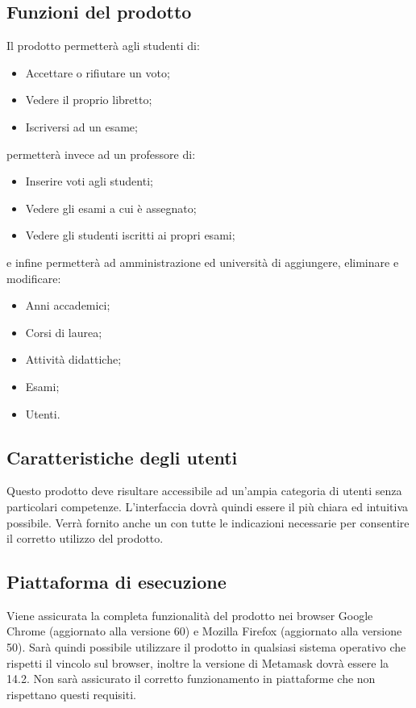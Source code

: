 	\subsection{Funzioni del prodotto}
	Il prodotto permetterà agli studenti di:
	\begin{itemize}
		\item Accettare o rifiutare un voto;
		\item Vedere il proprio libretto;
		\item Iscriversi ad un esame;
	\end{itemize}
	permetterà invece ad un professore di:
	\begin{itemize}
		\item Inserire voti agli studenti;
		\item Vedere gli esami a cui è assegnato;
		\item Vedere gli studenti iscritti ai propri esami;
	\end{itemize}
	e infine permetterà ad amministrazione ed università di aggiungere, eliminare e modificare:
	\begin{itemize}
		\item Anni accademici;
		\item Corsi di laurea;
		\item Attività didattiche;
		\item Esami;
		\item Utenti.
	\end{itemize}
	
	\subsection{Caratteristiche degli utenti}
	Questo prodotto deve risultare accessibile ad un'ampia categoria di utenti senza particolari competenze. L’interfaccia dovrà quindi essere il più chiara ed intuitiva possibile. Verrà fornito anche un \MU{} con tutte le indicazioni necessarie per consentire il corretto utilizzo del prodotto.
	
	\subsection{Piattaforma di esecuzione}
Viene assicurata la completa funzionalità del prodotto nei browser Google Chrome (aggiornato alla versione 60) e Mozilla Firefox (aggiornato alla versione 50).
Sarà quindi possibile utilizzare il prodotto in qualsiasi sistema operativo che rispetti il vincolo sul browser, inoltre la versione di Metamask dovrà essere la 14.2.
Non sarà assicurato il corretto funzionamento in piattaforme che non rispettano questi requisiti.
